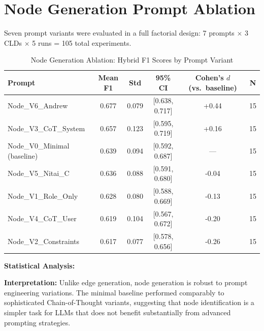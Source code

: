 \section{Node Generation Prompt Ablation}
\label{sec:ablation_node}

Seven prompt variants were evaluated in a full factorial design: 7 prompts $\times$ 3 CLDs $\times$ 5 runs = 105 total experiments.

\begin{table}[H]
\centering
\caption{Node Generation Ablation: Hybrid F1 Scores by Prompt Variant}
\label{tab:node_ablation}
\footnotesize
\begin{tabular}{@{}lccccc@{}}
\toprule
\textbf{Prompt} & \textbf{Mean F1} & \textbf{Std} & \textbf{95\% CI} & \textbf{Cohen's $d$ (vs.\ baseline)} & \textbf{N} \\
\midrule
Node\_V6\_Andrew & 0.677 & 0.079 & [0.638, 0.717] & +0.44 & 15 \\
Node\_V3\_CoT\_System & 0.657 & 0.123 & [0.595, 0.719] & +0.16 & 15 \\
Node\_V0\_Minimal (baseline) & 0.639 & 0.094 & [0.592, 0.687] & --- & 15 \\
Node\_V5\_Nitai\_C & 0.636 & 0.088 & [0.591, 0.680] & -0.04 & 15 \\
Node\_V1\_Role\_Only & 0.628 & 0.080 & [0.588, 0.669] & -0.13 & 15 \\
Node\_V4\_CoT\_User & 0.619 & 0.104 & [0.567, 0.672] & -0.20 & 15 \\
Node\_V2\_Constraints & 0.617 & 0.077 & [0.578, 0.656] & -0.26 & 15 \\
\bottomrule
\end{tabular}
\end{table}

\textbf{Statistical Analysis:}
\begin{itemize}[noitemsep]
\end{itemize}

\textbf{Interpretation:} Unlike edge generation, node generation is robust to prompt engineering variations. The minimal baseline performed comparably to sophisticated Chain-of-Thought variants, suggesting that node identification is a simpler task for LLMs that does not benefit substantially from advanced prompting strategies.

